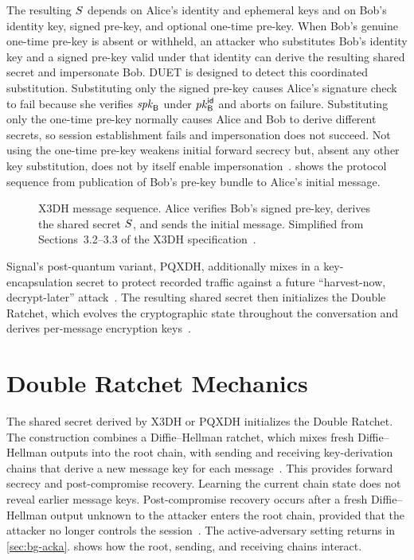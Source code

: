 The resulting $S$ depends on Alice's identity and ephemeral keys and on Bob's identity key,
signed pre-key, and optional one-time pre-key. When Bob's genuine one-time pre-key is absent or
withheld, an attacker who substitutes Bob's identity key and a signed pre-key valid under that
identity can derive the resulting shared secret and impersonate Bob. DUET is designed to detect this
coordinated substitution. Substituting only the signed pre-key causes Alice's signature check to
fail because she verifies $\mathit{spk}_{\mathsf{B}}$ under $\mathit{pk}^{\mathsf{id}}_{\mathsf{B}}$ and aborts on failure. Substituting only the
one-time pre-key normally causes Alice and Bob to derive different secrets, so session establishment
fails and impersonation does not succeed. Not using the one-time pre-key weakens initial forward
secrecy but, absent any other key substitution, does not by itself enable
impersonation~\cite[Sections~3.3, 3.4, and 4.7]{x3dh}.  shows the protocol sequence from
publication of Bob's pre-key bundle to Alice's initial message.

\begin{figure}[H]
\centering

\caption[X3DH message sequence.]{X3DH message sequence. Alice verifies Bob's signed pre-key,
derives the shared secret $S$, and sends the initial message. Simplified from
Sections~3.2--3.3 of the X3DH specification~\cite{x3dh}.}
\label{fig:bg-x3dh}
\end{figure}

Signal's post-quantum variant, PQXDH, additionally mixes in a key-encapsulation secret to protect
recorded traffic against a future ``harvest-now, decrypt-later'' attack~\cite[Section~4.7]{pqxdh}. The resulting shared secret then initializes the Double Ratchet, which
evolves the cryptographic state throughout the conversation and derives per-message encryption
keys~\cite[Sections~2.1--2.4]{doubleratchet}.

\section{Double Ratchet Mechanics}\label{sec:ext-ratchet}

The shared secret derived by X3DH or PQXDH initializes the Double Ratchet. The construction combines
a Diffie--Hellman ratchet, which mixes fresh Diffie--Hellman outputs into the root chain, with
sending and receiving key-derivation chains that derive a new message key for each
message~\cite{doubleratchet}. This provides forward secrecy and
post-compromise recovery. Learning the current chain state does not reveal earlier message keys.
Post-compromise recovery occurs after a fresh Diffie--Hellman output unknown to the attacker enters
the root chain, provided that the attacker no longer controls the
session~\cite[Section~8.2]{doubleratchet}. The active-adversary setting returns in
\cref{sec:bg-acka}.  shows how the root, sending, and receiving chains
interact.

